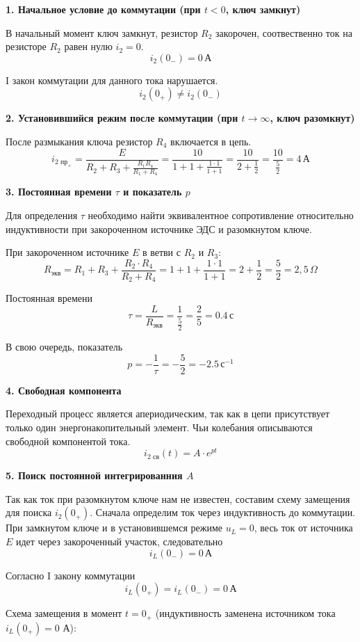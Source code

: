 \documentclass[12pt]{article}
\begin{document}
\textbf{1. Начальное условие до коммутации (при $t < 0$, ключ замкнут)}

В начальный момент ключ замкнут, резистор $R_2$ закорочен, соотвественно ток на резисторе $R_2$ равен нулю $i_2 = 0$.
\[
i_2(0_-) = 0\,\text{А}
\]

I закон коммутации для данного тока нарушается.
\[
i_2(0_+) \neq i_2(0_-)
\]

\textbf{2. Установившийся режим после коммутации (при $t \to \infty$, ключ разомкнут)}

После размыкания ключа резистор $R_4$ включается в цепь. 
\[
i_{2 \text{ пр}_+} = \frac{E}{R_2 + R_3 + \frac{R_1R_4}{R_1 + R_4}} = \frac{10}{1 + 1 + \frac{1 \cdot 1}{1 + 1}} = \frac{10}{2 + \frac{1}{2}} = \frac{10}{\frac{5}{2}} = 4\,\text{А}
\]

\textbf{3. Постоянная времени $\tau$ и показатель $p$}

Для определения $\tau$ необходимо найти эквивалентное сопротивление относительно индуктивности при закороченном источнике ЭДС и разомкнутом ключе.

При закороченном источнике $E$ в ветви с $R_2$ и $R_3$:
\[
R_{\text{экв}} = R_1 + R_3 + \frac{R_2 \cdot R_4}{R_2 + R_4} = 1 + 1 + \frac{1 \cdot 1}{1 + 1} = 2 + \frac{1}{2} = \frac{5}{2} = 2{,}5\,\Omega
\]

Постоянная времени
\[
\tau = \frac{L}{R_{\text{экв}}} = \frac{1}{\frac{5}{2}} = \frac{2}{5} = 0.4\,\text{с}
\]

В свою очередь, показатель 
\[
p = -\frac{1}{\tau} = -\frac{5}{2} = -2.5\,\text{с}^{-1}
\]

\textbf{4. Свободная компонента}

Переходный процесс является апериодическим, так как в цепи присутствует только один энергонакопительный элемент. Чьи колебания описываются свободной компонентой тока.
\[
i_{2\text{ св}}(t) = A \cdot e^{pt}
\]

\textbf{5. Поиск постоянной интегрированния $A$}

Так как ток при разомкнутом ключе нам не известен, составим схему замещения для поиска $i_2(0_+)$.
Сначала определим ток через индуктивность до коммутации. При замкнутом ключе и в установившемся режиме $u_L = 0$, весь ток от источника $E$ идет через закороченный участок, следовательно
\[
i_L(0_-) = 0\,\text{А}
\]

Согласно I закону коммутации
\[
i_L(0_+) = i_L(0_-) = 0\,\text{А}
\]

Схема замещения в момент $t = 0_+$ (индуктивность заменена источником тока $i_L(0_+) = 0$ А):
\end{document}
